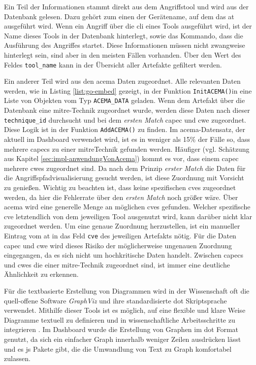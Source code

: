 \par Ein Teil der Informationen stammt direkt aus dem Angriffstool und wird aus der Datenbank gelesen. Dazu gehört zum einen der Gerätename, auf dem das \gls{at} ausgeführt wird. Wenn ein Angriff über die \gls{cli} eines Tools ausgeführt wird, ist der Name dieses Tools in der Datenbank hinterlegt, sowie das Kommando, dass die Ausführung des Angriffes startet. Diese Informationen müssen nicht zwangweise hinterlegt sein, sind aber in den meisten Fällen vorhanden. Über den Wert des Feldes \verb|tool_name| kann in der Übersicht aller Artefakte gefiltert werden.
\par Ein anderer Teil wird aus den \gls{acema} Daten zugeordnet. Alle relevanten Daten werden, wie in Listing \ref{list:go-embed} gezeigt, in der Funktion \verb|InitACEMA()|in eine Liste von Objekten vom Typ \verb|ACEMA_DATA| geladen. Wenn dem Artefakt über die Datenbank eine \gls{mitre}-Technik zugeordnet wurde, werden diese Daten nach dieser \verb|technique_id| durchsucht und bei dem \textit{ersten Match} \gls{capec} und \gls{cwe} zugeordnet. Diese Logik ist in der Funktion \verb|AddACEMA()| zu finden. Im \gls{acema}-Datensatz, der aktuell im Dashboard verwendet wird, ist es in weniger als 15\% der Fälle so, dass mehrere \glspl{capec} zu einer \gls{mitre}Technik gefunden werden. Häufiger (vgl. Schätzung aus Kapitel \ref{sec:impl-anwendungVonAcema}) kommt es vor, dass einem \gls{capec} mehrere \glspl{cwe} zugeordnet sind. Da nach dem Prinzip \textit{erster Match} die Daten für die Angriffspfadvisualisierung gesucht werden, ist diese Zuordnung mit Vorsicht zu genießen. Wichtig zu beachten ist, dass keine spezifischen \glspl{cve} zugeordnet werden, da hier die Fehlerrate über den \textit{ersten Match} noch größer wäre. Über \gls{acema} wird eine generelle Menge an möglichen \glspl{cve} gefunden. Welcher spezifische \gls{cve} letztendlich von dem jeweiligen Tool ausgenutzt wird, kann darüber nicht klar zugeordnet werden. Um eine genaue Zuordnung herzustellen, ist ein manueller Eintrag vom \gls{at} in das Feld \verb|cve| des jeweiligen Artefakts nötig. Für die Daten \gls{capec} und \gls{cwe} wird dieses Risiko der möglicherweise ungenauen Zuordnung eingegangen, da es sich nicht um hochkritische Daten handelt. Zwischen \glspl{capec} und \glspl{cwe} die einer \gls{mitre}-Technik zugeordnet sind, ist immer eine deutliche Ähnlichkeit zu erkennen.
\par Für die textbasierte Erstellung von Diagrammen wird in der Wissenschaft oft die quell-offene Software \textit{GraphViz} und ihre standardisierte \gls{dot} Skriptsprache verwendet. Mithilfe dieser Tools ist es möglich, auf eine flexible und klare Weise Diagramme textuell zu definieren und in wissenschaftliche Arbeitsschritte zu integrieren \autocite{Graphviz,DOTLanguage}. Im Dashboard wurde die Erstellung von Graphen im \gls{dot} Format genutzt, da sich ein einfacher Graph innerhalb weniger Zeilen ausdrücken lässt und es \gls{js} Pakete gibt, die die Umwandlung von Text zu Graph komfortabel zulassen.
